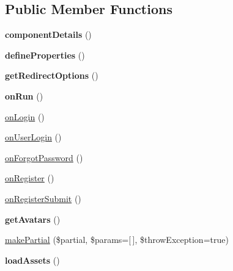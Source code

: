 \subsection*{Public Member Functions}
\begin{DoxyCompactItemize}
\item 
\hypertarget{classDMA_1_1Friends_1_1Components_1_1UserLogin_acdfe6ac44ada2b3cfd131e0529e939bf}{{\bfseries component\+Details} ()}\label{classDMA_1_1Friends_1_1Components_1_1UserLogin_acdfe6ac44ada2b3cfd131e0529e939bf}

\item 
\hypertarget{classDMA_1_1Friends_1_1Components_1_1UserLogin_aed0e2d9c2a568fa59e91b24d2c920639}{{\bfseries define\+Properties} ()}\label{classDMA_1_1Friends_1_1Components_1_1UserLogin_aed0e2d9c2a568fa59e91b24d2c920639}

\item 
\hypertarget{classDMA_1_1Friends_1_1Components_1_1UserLogin_af4bf91673455e94e2af6807fcc7535cf}{{\bfseries get\+Redirect\+Options} ()}\label{classDMA_1_1Friends_1_1Components_1_1UserLogin_af4bf91673455e94e2af6807fcc7535cf}

\item 
\hypertarget{classDMA_1_1Friends_1_1Components_1_1UserLogin_a0820819b4447a5279432463d42d7a4e6}{{\bfseries on\+Run} ()}\label{classDMA_1_1Friends_1_1Components_1_1UserLogin_a0820819b4447a5279432463d42d7a4e6}

\item 
\hyperlink{classDMA_1_1Friends_1_1Components_1_1UserLogin_ae62d795e0eb073ab1e9b6e74425a04a7}{on\+Login} ()
\item 
\hyperlink{classDMA_1_1Friends_1_1Components_1_1UserLogin_a9f64120e2a98aca7bb6ad628d9a72844}{on\+User\+Login} ()
\item 
\hyperlink{classDMA_1_1Friends_1_1Components_1_1UserLogin_a232f43a38ed3fcdb7ebf6c774b031496}{on\+Forgot\+Password} ()
\item 
\hyperlink{classDMA_1_1Friends_1_1Components_1_1UserLogin_a61008348cecd24a9b01b20aeebc04b4b}{on\+Register} ()
\item 
\hyperlink{classDMA_1_1Friends_1_1Components_1_1UserLogin_adb35ec3a5460d1a197337104a54b55b1}{on\+Register\+Submit} ()
\item 
\hypertarget{classDMA_1_1Friends_1_1Components_1_1UserLogin_a5390d4ee17957bf8df7209892cfdadb0}{{\bfseries get\+Avatars} ()}\label{classDMA_1_1Friends_1_1Components_1_1UserLogin_a5390d4ee17957bf8df7209892cfdadb0}

\item 
\hyperlink{classDMA_1_1Friends_1_1Components_1_1UserLogin_a5845beab2a28f2a742da61b23a680eda}{make\+Partial} (\$partial, \$params=\mbox{[}$\,$\mbox{]}, \$throw\+Exception=true)
\item 
\hypertarget{classDMA_1_1Friends_1_1Components_1_1UserLogin_a58168b62fe7af6d5c5a70c3cd83c9707}{{\bfseries load\+Assets} ()}\label{classDMA_1_1Friends_1_1Components_1_1UserLogin_a58168b62fe7af6d5c5a70c3cd83c9707}

\end{DoxyCompactItemize}
